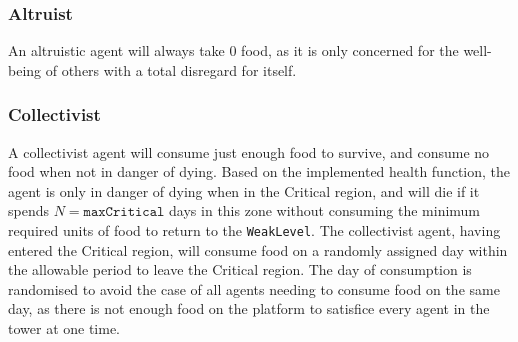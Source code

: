 



\subsubsection{Altruist}
An altruistic agent will always take 0 food, as it is only concerned for the well-being of others with a total disregard for itself.

\subsubsection{Collectivist}
A collectivist agent will consume just enough food to survive, and consume no food when not in danger of dying. Based on the implemented health function, the agent is only in danger of dying when in the Critical region, and will die if it spends $N=\texttt{maxCritical}$ days in this zone without consuming the minimum required units of food to return to the \texttt{WeakLevel}. The collectivist agent, having entered the Critical region, will consume food on a randomly assigned day within the allowable period to leave the Critical region. The day of consumption is randomised to avoid the case of all agents needing to consume food on the same day, as there is not enough food on the platform to satisfice every agent in the tower at one time.

